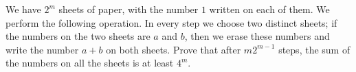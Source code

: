 We have 
$2^m$
 sheets of paper, with the number 
$1$
 written on each of them. We perform the following operation. In every step we choose two distinct sheets; if the numbers on the two sheets are 
$a$
 and 
$b$, 
 then we erase these numbers and write the number 
$a + b$
 on both sheets. Prove that after 
$m2^{m -1}$
 steps, the sum of the numbers on all the sheets is at least 
$4^m$.


